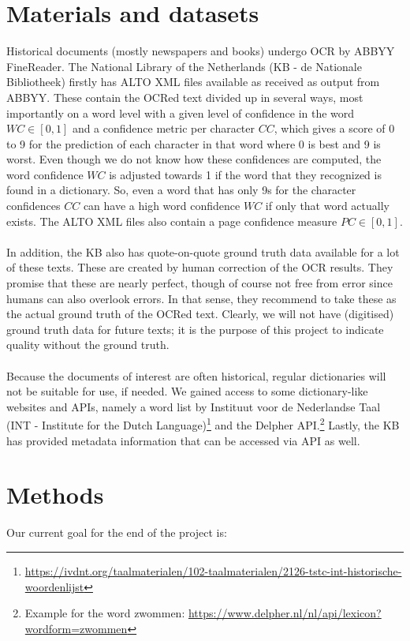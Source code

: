 \documentclass{article}
\begin{document}
	\section{Materials and datasets}
	Historical documents (mostly newspapers and books) undergo OCR by ABBYY FineReader. The National Library of the Netherlands (KB - de Nationale Bibliotheek) firstly has ALTO XML files available as received as output from ABBYY. These contain the OCRed text divided up in several ways, most importantly on a word level with a given level of confidence in the word $WC \in [0,1]$ and a confidence metric per character $CC$, which gives a score of 0 to 9 for the prediction of each character in that word where 0 is best and 9 is worst. Even though we do not know how these confidences are computed, the word confidence $WC$ is adjusted towards 1 if the word that they recognized is found in a dictionary. So, even a word that has only 9s for the character confidences $CC$ can have a high word confidence $WC$ if only that word actually exists. The ALTO XML files also contain a page confidence measure $PC \in [0,1]$.
	\\ \\
	In addition, the KB also has quote-on-quote ground truth data available for a lot of these texts. These are created by human correction of the OCR results. They promise that these are nearly perfect, though of course not free from error since humans can also overlook errors. In that sense, they recommend to take these as the actual ground truth of the OCRed text. Clearly, we will not have (digitised) ground truth data for future texts; it is the purpose of this project to indicate quality without the ground truth.
	\\ \\
	Because the documents of interest are often historical, regular dictionaries will not be suitable for use, if needed. We gained access to some dictionary-like websites and APIs, namely a word list by Instituut voor de Nederlandse Taal (INT - Institute for the Dutch Language)\footnote{\url{https://ivdnt.org/taalmaterialen/102-taalmaterialen/2126-tstc-int-historische-woordenlijst}} and the Delpher API.\footnote{Example for the word zwommen: \url{https://www.delpher.nl/nl/api/lexicon?wordform=zwommen}} Lastly, the KB has provided metadata information that can be accessed via API as well.
	
	\section{Methods}
	Our current goal for the end of the project is:
	
\end{document}
